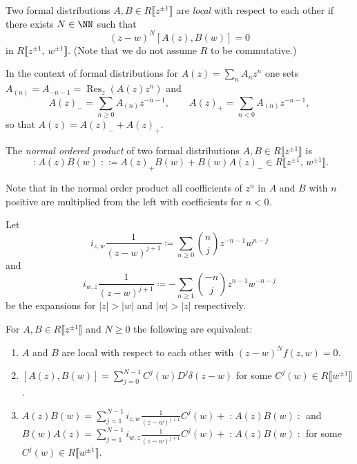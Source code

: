 \documentclass{ck-article}
\DeclareMathOperator\Res{Res}
\newcommand{\normord}[1]{\mathopen{:}#1\mathclose{:}}
\begin{document}
\begin{Definition}
    Two formal distributions $A, B \in R\lBrack z^{\pm1}\rBrack$ are \emph{local} with respect to each other if there exists $N \in \NN$ such that
    \[
        (z-w)^N[A(z), B(w)] = 0
    \]
    in $ R\lBrack z^{\pm1},\, w^{\pm1}\rBrack$. (Note that we do not assume $R$ to be commutative.)
\end{Definition}

In the context of formal distributions for $A(z) = \sum_n A_n z^n$ one sets $A_{(n)} = A_{-n-1} = \Res_z(A(z)z^{n})$ and
\[
    A(z)_- = \sum_{n \ge 0} A_{(n)}z^{-n-1}, \qquad A(z)_+ = \sum_{n < 0} A_{(n)} z^{-n-1},
\]
so that $A(z) = A(z)_{-} + A(z)_+$.

\begin{Definition}
    The \emph{normal ordered product} of two formal distributions $A, B \in R\lBrack z^{\pm1}\rBrack$ is
    \[
        \normord{A(z)B(w)} \coloneqq A(z)_+B(w) + B(w)A(z)_- \in  R\lBrack z^{\pm1},\, w^{\pm1}\rBrack.
    \]
\end{Definition}

Note that in the normal order product all coefficients of $z^n$ in $A$ and $B$ with $n$ positive are multiplied from the left with coefficients for $n < 0$.


Let
\[
    i_{z,w}\frac{1}{(z-w)^{j+1}} \coloneqq \sum_{n\ge 0} \binom{n}{j} z^{-n-1}w^{n-j}
\]
and
\[
    i_{w,z}\frac{1}{(z-w)^{j+1}} \coloneqq -\sum_{n\ge 1} \binom{-n}{j} z^{n-1}w^{-n-j}
\]
be the expansions for $|z| > |w|$ and $|w| > |z|$ respectively.


\begin{Proposition}
    For $A, B \in R\lBrack z^{\pm1}\rBrack$ and $N \ge 0$ the following are equivalent:
    \begin{enumerate}
        \item $A$ and $B$ are local with respect to each other with $(z-w)^N f(z,w) = 0$.
        \item $[A(z), B(w)] = \sum_{j=0}^{N-1} C^j(w) D^j\delta(z-w)$ for some $C^j(w) \in R\lBrack  w^{\pm1}\rBrack$.
        \item 
            $A(z)B(w) = \sum_{j=1}^{N-1} i_{z,w}\frac{1}{(z-w)^{j+1}} C^j(w) + \normord{A(z)B(w)}$ and
            $B(w)A(z) = \sum_{j=1}^{N-1} i_{w,z}\frac{1}{(z-w)^{j+1}} C^j(w) + \normord{A(z)B(w)}$
            for some $C^j(w) \in R\lBrack  w^{\pm1}\rBrack$.
    \end{enumerate}
\end{Proposition}
\end{document}
